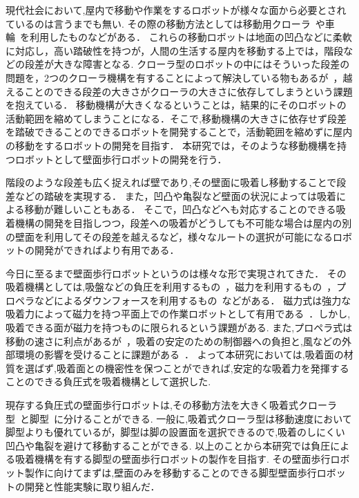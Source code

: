 \documentclass[uplatex,dvipdfmx]{jlreq}
\begin{document}
現代社会において,屋内で移動や作業をするロボットが様々な面から必要とされているのは言うまでも無い.
その際の移動方法としては移動用クローラ~\cite{小柳栄次2010サブクローラを持つレスキューロボット}や車輪~\cite{尾崎功一20082p2}を利用したものなどがある．
これらの移動ロボットは地面の凹凸などに柔軟に対応し，高い踏破性を持つが，人間の生活する屋内を移動する上では，階段などの段差が大きな障害となる.
クローラ型のロボットの中にはそういった段差の問題を，2つのクローラ機構を有することによって解決している物もあるが~\cite{小柳栄次2010サブクローラを持つレスキューロボット}，越えることのできる段差の大きさがクローラの大きさに依存してしまうという課題を抱えている．
移動機構が大きくなるということは，結果的にそのロボットの活動範囲を縮めてしまうことになる．そこで,移動機構の大きさに依存せず段差を踏破できることのできるロボットを開発することで，活動範囲を縮めずに屋内の移動をするロボットの開発を目指す．
本研究では，そのような移動機構を持つロボットとして壁面歩行ロボットの開発を行う．

階段のような段差も広く捉えれば壁であり,その壁面に吸着し移動することで段差などの踏破を実現する．
また，凹凸や亀裂など壁面の状況によっては吸着による移動が難しいこともある．
そこで，凹凸などへも対応することのできる吸着機構の開発を目指しつつ，段差への吸着がどうしても不可能な場合は屋内の別の壁面を利用してその段差を越えるなど，様々なルートの選択が可能になるロボットの開発ができればより有用である．

今日に至るまで壁面歩行ロボットというのは様々な形で実現されてきた．
その吸着機構としては,吸盤などの負圧を利用するもの~\cite{広瀬茂男1991四足壁面移動ロボット}，磁力を利用するもの~\cite{高田洋吾2013立体的な環境で活動できる橋梁検査ロボットの開発}，プロペラなどによるダウンフォースを利用するもの~\cite{weko_4205_1}などがある．
磁力式は強力な吸着力によって磁力を持つ平面上での作業ロボットとして有用である~\cite{高田洋吾2013立体的な環境で活動できる橋梁検査ロボットの開発}．しかし,吸着できる面が磁力を持つものに限られるという課題がある.
また,プロペラ式は移動の速さに利点があるが~\cite{weko_4205_1}，吸着の安定のための制御器への負担と,風などの外部環境の影響を受けることに課題がある~\cite{西亮1991推進力による壁面移動ロボットの研究,鈴木隆宏2009g1501}．
よって本研究においては,吸着面の材質を選ばず,吸着面との機密性を保つことができれば,安定的な吸着力を発揮することのできる負圧式を吸着機構として選択した.

現存する負圧式の壁面歩行ロボットは,その移動方法を大きく吸着式クローラ型~\cite{福田敏男1994壁面走行ロボットの研究}と脚型~\cite{広瀬茂男1991四足壁面移動ロボット}に分けることができる.
一般に,吸着式クローラ型は移動速度において脚型よりも優れているが\cite{福田敏男1992壁面走行ロボッ}，脚型は脚の設置面を選択できるので,吸着のしにくい凹凸や亀裂を避けて移動することができる.
以上のことから本研究では負圧による吸着機構を有する脚型の壁面歩行ロボットの製作を目指す.
その壁面歩行ロボット製作に向けてまずは,壁面のみを移動することのできる脚型壁面歩行ロボットの開発と性能実験に取り組んだ．
\end{document}

